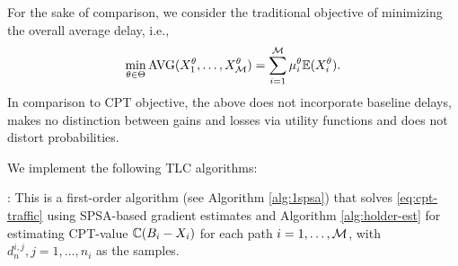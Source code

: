 For the sake of comparison, we consider the traditional objective of minimizing the overall average delay, i.e.,
\begin{align}
\min_{\theta\in \Theta}\text{AVG}(X_1^\theta,\ldots,X_{\mathcal{M}}^\theta) = \sum_{i=1}^{\mathcal{M}} \mu_i^\theta \mathbb{E}(X_i^\theta). \label{eq:avg-traffic} 
\end{align}
In comparison to CPT objective, the above does not incorporate baseline delays, makes no distinction between gains and losses via utility functions and does not distort probabilities. 
% 
% 
% 

We implement the following TLC algorithms:

: This is a first-order algorithm (see Algorithm \ref{alg:1spsa}) that solves \eqref{eq:cpt-traffic} using SPSA-based gradient estimates and Algorithm \ref{alg:holder-est} for estimating CPT-value $\mathbb{C}(B_i-X_i)$ for each path $i=1,\ldots,\mathcal{M}$, with $d_n^{i,j}, j=1,\ldots,n_i$ as the samples.


